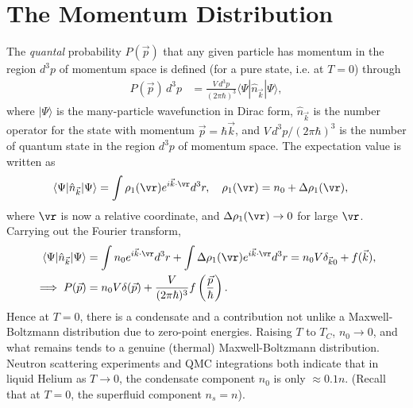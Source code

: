 \documentclass[a4paper, 11pt, normalem]{report}
\begin{document}
\section{The Momentum Distribution}
The \emph{quantal} probability $P(\vec{p})$ that any given particle has momentum in the region $d^3p$ of momentum space is defined (for a pure state, i.e. at $T=0$) through
\begin{align}
    P(\vec{p})\,d^3p &= \frac{V\,d^3p}{(2\pi\hbar)^3}\langle\Psi|\hat{n}_{\vec{k}}|\Psi\rangle,
\end{align}
where $|\Psi\rangle$ is the many-particle wavefunction in Dirac form, $\hat{n}_{\vec{k}}$ is the number operator for the state with momentum $\vec{p}=\hbar\vec{k}$, and $V\,d^3p/(2\pi\hbar)^3$ is the number of quantum state in the region $d^3p$ of momentum space.
The expectation value is written as
\begin{align}
    \langle\Psi|\hat{n}_{\vec{k}}|\Psi\rangle &= \int \rho_1(\vr)e^{i\vec{k}\cdot\vr}d^3r, \quad \rho_1(\vr) = n_0 + \Delta\rho_1(\vr),
\end{align}
where $\vr$ is now a relative coordinate, and $\Delta\rho_1(\vr)\to0$ for large $\vr$.
Carrying out the Fourier transform,
\begin{align}
    \langle\Psi|\hat{n}_{\vec{k}}|\Psi\rangle &= \int n_0e^{i\vec{k}\cdot\vr}d^3r + \int \Delta\rho_1(\vr)e^{i\vec{k}\cdot\vr}d^3r = n_0V\delta_{\vec{k}0} + f(\vec{k}),\\
    \implies P(\vec{p}) &= n_0V\delta(\vec{p}) + \frac{V}{(2\pi\hbar)^3}f\left(\frac{\vec{p}}{\hbar}\right).
\end{align}
Hence at $T=0$, there is a condensate and a contribution not unlike a Maxwell-Boltzmann distribution due to zero-point energies.
Raising $T$ to $T_C$, $n_0\to0$, and what remains tends to a genuine (thermal) Maxwell-Boltzmann distribution.
Neutron scattering experiments and QMC integrations both indicate that in liquid Helium as $T\to0$, the condensate component $n_0$ is only $\approx0.1n$.
(Recall that at $T=0$, the superfluid component $n_s=n$).
\end{document}

